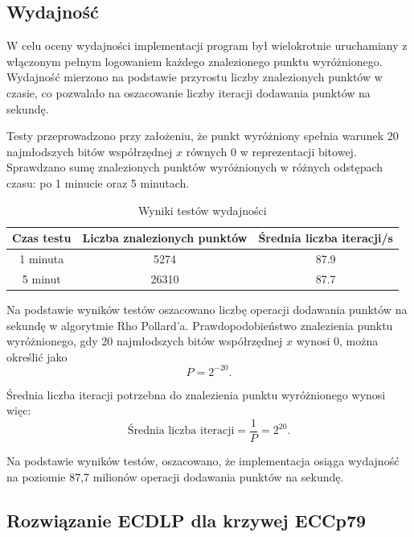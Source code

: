\subsection{Wydajność}

W celu oceny wydajności implementacji program był wielokrotnie uruchamiany z
włączonym pełnym logowaniem każdego znalezionego punktu wyróżnionego. Wydajność
mierzono na podstawie przyrostu liczby znalezionych punktów w czasie, co pozwalało
na oszacowanie liczby iteracji dodawania punktów na sekundę.

Testy przeprowadzono przy założeniu, że punkt wyróżniony spełnia warunek 20
najmłodszych bitów współrzędnej $x$ równych $0$ w reprezentacji bitowej.
Sprawdzano sumę znalezionych punktów wyróżnionych w różnych odstępach czasu:
po 1 minucie oraz 5 minutach.

\begin{table}[h!]
    \centering
    \caption{Wyniki testów wydajności}
    \begin{tabular}{|c|c|c|}
        \hline
        \textbf{Czas testu} & \textbf{Liczba znalezionych punktów} &
        \textbf{Średnia liczba iteracji/s}                                \\ \hline
        1 minuta            & 5274                                 & 87.9 \\ \hline
        5 minut             & 26310                                & 87.7 \\ \hline
    \end{tabular}
    \label{tab:performance}
\end{table}

Na podstawie wyników testów oszacowano liczbę operacji dodawania punktów na
sekundę w algorytmie Rho Pollard'a. Prawdopodobieństwo znalezienia punktu wyróżnionego,
gdy 20 najmłodszych bitów współrzędnej $x$ wynosi $0$, można określić jako
$$
    P = 2^{-20}.
$$

Średnia liczba iteracji potrzebna do znalezienia punktu wyróżnionego wynosi
więc:
$$
    \text{Średnia liczba iteracji} = \frac{1}{P} = 2^{20}.
$$

Na podstawie wyników testów, oszacowano, że implementacja osiąga wydajność na
poziomie 87,7 milionów operacji dodawania punktów na sekundę.

\subsection{Rozwiązanie ECDLP dla krzywej ECCp79}

